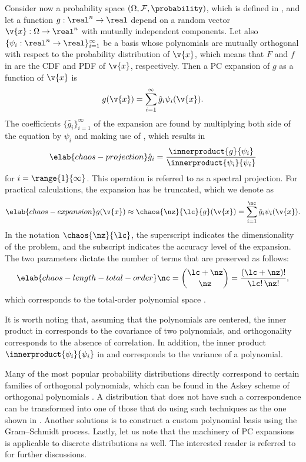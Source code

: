 Consider now a probability space $(\Omega, \mathcal{F}, \probability)$, which is
defined in , and let a function $g: \real^n \to \real$
depend on a random vector $\v{x}: \Omega \to \real^n$ with mutually independent
components. Let also $\{ \psi_i: \real^n \to \real \}_{i = 1}^\infty$ be a basis
whose polynomials are mutually orthogonal with respect to the probability
distribution of $\v{x}$, which means that $F$ and $f$ in
 are the \ac{CDF} and \ac{PDF} of $\v{x}$,
respectively. Then a \ac{PC} expansion of $g$ as a function of $\v{x}$ is
\[
  g(\v{x}) = \sum_{i = 1}^\infty \hat{g}_i \psi_i(\v{x}).
\]
The coefficients $\{ \hat{g}_i \}_{i = 1}^\infty$ of the expansion are found by
multiplying both side of the equation by $\psi_i$ and making use of
, which results in
\begin{equation} \elab{chaos-projection}
  \hat{g}_i = \frac{\innerproduct{g}{\psi_i}}{\innerproduct{\psi_i}{\psi_i}}
\end{equation}
for $i = \range{1}{\infty}$. This operation is referred to as a spectral
projection. For practical calculations, the expansion has be truncated, which we
denote as
\begin{equation} \elab{chaos-expansion}
  g(\v{x}) \approx \chaos{\nz}{\lc}{g}(\v{x}) = \sum_{i = 1}^\nc \hat{g}_i \psi_i(\v{x}).
\end{equation}
In the notation $\chaos{\nz}{\lc}$, the superscript \nz indicates the
dimensionality of the problem, and the subscript \lc indicates the accuracy
level of the expansion. The two parameters dictate the number of terms \nc that
are preserved as follows:
\begin{equation} \elab{chaos-length-total-order}
  \nc = { \lc + \nz \choose \nz } = \frac{(\lc + \nz)!}{\lc! \, \nz!},
\end{equation}
which corresponds to the total-order polynomial space \cite{eldred2008,
beck2011}.

It is worth noting that, assuming that the polynomials are centered, the inner
product in  corresponds to the covariance of two
polynomials, and orthogonality corresponds to the absence of correlation. In
addition, the inner product $\innerproduct{\psi_i}{\psi_i}$ in
 and  corresponds to the
variance of a polynomial.

Many of the most popular probability distributions directly correspond to
certain families of orthogonal polynomials, which can be found in the Askey
scheme of orthogonal polynomials \cite{xiu2010}. A distribution that does not
have such a correspondence can be transformed into one of those that do using
such techniques as the one shown in . Another
solutions is to construct a custom polynomial basis using the Gram--Schmidt
process. Lastly, let us note that the machinery of \ac{PC} expansions is
applicable to discrete distributions as well. The interested reader is referred
to \cite{xiu2010} for further discussions.

